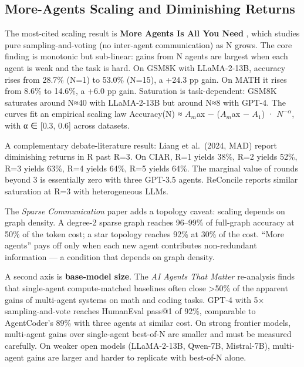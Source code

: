 \documentclass{article}
\begin{document}
\subsection{More-Agents Scaling and Diminishing Returns}\label{more-agents-scaling-and-diminishing-returns}

The most-cited scaling result is \textbf{More Agents Is All You Need} \citep{li2024asurveyonllmbasedm}, which studies pure sampling-and-voting (no inter-agent communication) as N grows. The core finding is monotonic but sub-linear: gains from N agents are largest when each agent is weak and the task is hard. On GSM8K with LLaMA-2-13B, accuracy rises from 28.7\% (N=1) to 53.0\% (N=15), a +24.3 pp gain. On MATH it rises from 8.6\% to 14.6\%, a +6.0 pp gain. Saturation is task-dependent: GSM8K saturates around N≈40 with LLaMA-2-13B but around N≈8 with GPT-4. The curves fit an empirical scaling law Accuracy(N) ≈ \(A_m\)ax − (\(A_m\)ax − \(A_1\)) · \(N^{-α}\), with α ∈ {[}0.3, 0.6{]} across datasets.

A complementary debate-literature result: Liang et al.~(2024, MAD) report diminishing returns in R past R=3. On CIAR, R=1 yields 38\%, R=2 yields 52\%, R=3 yields 63\%, R=4 yields 64\%, R=5 yields 64\%. The marginal value of rounds beyond 3 is essentially zero with three GPT-3.5 agents. ReConcile \citep{chen2024asurveyonllmbasedm} reports similar saturation at R=3 with heterogeneous LLMs.

The \emph{Sparse Communication} paper \citep{li2024asurveyonllmbasedm} adds a topology caveat: scaling depends on graph density. A degree-2 sparse graph reaches 96--99\% of full-graph accuracy at 50\% of the token cost; a star topology reaches 92\% at 30\% of the cost. ``More agents'' pays off only when each new agent contributes non-redundant information --- a condition that depends on graph density.

A second axis is \textbf{base-model size}. The \emph{AI Agents That Matter} re-analysis \citep{kapoor2024aiagentsthatmatter} finds that single-agent compute-matched baselines often close \textgreater50\% of the apparent gains of multi-agent systems on math and coding tasks. GPT-4 with 5× sampling-and-vote reaches HumanEval pass@1 of 92\%, comparable to AgentCoder's 89\% with three agents at similar cost. On strong frontier models, multi-agent gains over single-agent best-of-N are smaller and must be measured carefully. On weaker open models (LLaMA-2-13B, Qwen-7B, Mistral-7B), multi-agent gains are larger and harder to replicate with best-of-N alone.
\end{document}
